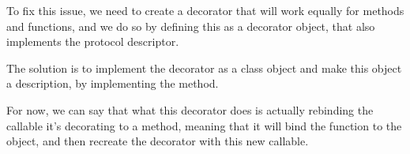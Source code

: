 \documentclass[a4paper,10pt,english]{sphinxmanual}
\begin{document}
To fix this issue, we need to create a decorator that will work equally for methods and
functions, and we do so by defining this as a decorator object, that also implements the
protocol descriptor.

The solution is to implement the decorator as a class object and make this object a
description, by implementing the  method.

\begin{sphinxVerbatim}[commandchars=\\\{\}]
   
   

 
      
          

      
         

       
           
             

          
\end{sphinxVerbatim}

For now, we can say that what this decorator does is
actually rebinding the callable it’s decorating to a method, meaning that it will bind the
function to the object, and then recreate the decorator with this new callable.
\end{document}
